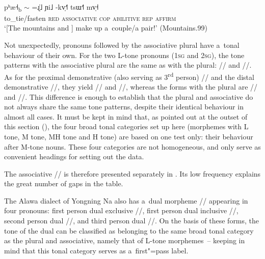 \begin{exe}
  \ex
  \label{ex:themountainsmakeupacouple}
  \\
  \gll pʰæ˧\textsubscript{b}	   {$\sim$}	=ɻ̍˩	ɲi˩	-kv̩˧˥		tsɯ˧˥	mv̩˧\\
  to\_tie/fasten	   \textsc{red}	\textsc{associative}	\textsc{cop}	\textsc{abilitive}	\textsc{rep}
  \textsc{affirm}\\
  \glt ‘[The mountains  and ] make up a~couple/a pair!’ (Mountains.99)
\end{exe}

Not unexpectedly, pronouns followed by the associative plural have a~tonal behaviour of their own. For the two L-tone pronouns (1\textsc{sg} and
2\textsc{sg}), the tone patterns with the associative plural are the same as with the plural: //
and //. As for the proximal demonstrative (also serving as 3\textsuperscript{rd} person)
// and the distal demonstrative //, they yield // and
//, whereas the forms with the plural are // and //. This difference is enough to establish that the plural and associative do not always share the same tone patterns, despite their identical behaviour in almost all cases. It must be kept in mind that, as pointed out at the outset of this section (), the four broad tonal categories set up here (morphemes with L tone, M tone, MH tone and H tone) are based on one test only: their behaviour after M-tone nouns. These four categories are not homogeneous, and only serve as convenient headings for setting out the data.

The associative // is therefore presented separately in . Its low frequency explains the great number of gaps in the table.  

The Alawa dialect of Yongning Na also has a~dual morpheme // appearing in four pronouns: first person dual exclusive //, first person dual inclusive //, second person dual //, and third person dual //. On the basis of these forms, the tone of the dual can be classified as belonging to the same broad tonal category as the plural and associative, namely that of L-tone morphemes~-- keeping in mind that this tonal category serves as a~first"=pass label.

